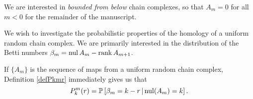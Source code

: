 \begin{remark}
  \label{rem:bdd}
  We are interested in {\em bounded from below} chain complexes, so that $A_m = 0$ for all $m < 0$
  for the remainder of the manuscript.
\end{remark}



We wish to investigate the probabilistic properties of the homology of a uniform random
chain complex.  We are primarily interested in the distribution of the Betti
numbers $\beta_m = \mathrm{nul} \,A_m - \operatorname{\mathrm{rank}} A_{m+1}$.

\begin{remark}
If $\{A_m\}$ is the sequence of maps from a uniform random chain complex, Definition
\ref{defPkmr} immediately gives us that
\[
  P^m_k(r) = \mathbb{P}\left[\beta_m = k-r \,|\, \mathrm{nul}(A_{m}) = k\right].
\]
\end{remark}





